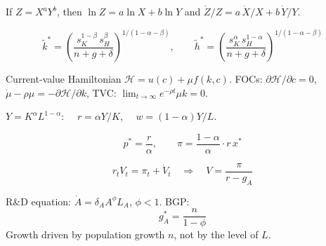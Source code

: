 \documentclass[a4paper,11pt]{article}
\newcommand{\ktilde}{\tilde{k}}
\begin{document}
\begin{pointsbox}[title=A.1 \quad Log-Differentiation]
If $Z = X^a Y^b$, then $\ln Z = a \ln X + b \ln Y$ and $\dot{Z}/Z = a\,\dot{X}/X + b\,\dot{Y}/Y$.
\end{pointsbox}

\bigskip
\begin{pointsbox}[title=A.2 \quad MRW Steady State]
\[
  \ktilde^* = \left(\frac{s_K^{1-\beta}\,s_H^{\beta}}{n+g+\delta}\right)^{\!1/(1-\alpha-\beta)}, \qquad
  \tilde{h}^* = \left(\frac{s_K^{\alpha}\,s_H^{1-\alpha}}{n+g+\delta}\right)^{\!1/(1-\alpha-\beta)}
\]
\end{pointsbox}

\bigskip
\begin{pointsbox}[title=A.3 \quad Hamiltonian First-Order Conditions]
Current-value Hamiltonian $\mathcal{H} = u(c) + \mu f(k,c)$. FOCs:
$\partial \mathcal{H}/\partial c = 0$, \quad $\dot{\mu} - \rho\mu = -\partial\mathcal{H}/\partial k$, \quad TVC: $\lim_{t\to\infty} e^{-\rho t}\mu k = 0$.
\end{pointsbox}

\bigskip
\begin{pointsbox}[title=A.4 \quad Cobb-Douglas Factor Payments]
$Y = K^\alpha L^{1-\alpha}$: $\quad r = \alpha Y/K$, $\quad w = (1-\alpha)Y/L$.
\end{pointsbox}

\bigskip
\begin{pointsbox}[title=A.5 \quad Romer Monopoly Pricing]
\[
  p^* = \frac{r}{\alpha}, \qquad \pi = \frac{1-\alpha}{\alpha}\cdot r\, x^*
\]
\end{pointsbox}

\bigskip
\begin{pointsbox}[title=A.6 \quad Romer BGP Bellman (No Creative Destruction)]
\[
  r_t V_t = \pi_t + \dot{V}_t \quad \Longrightarrow \quad V = \frac{\pi}{r - g_A}
\]
\end{pointsbox}

\bigskip
\begin{pointsbox}[title=A.7 \quad Jones (1995) BGP Growth Rate]
R\&D equation: $\dot{A} = \delta_A A^{\phi} L_A$, $\phi < 1$. BGP:
\[
  g_A^* = \frac{n}{1 - \phi}
\]
Growth driven by population growth $n$, not by the level of $L$.
\end{pointsbox}
\end{document}
